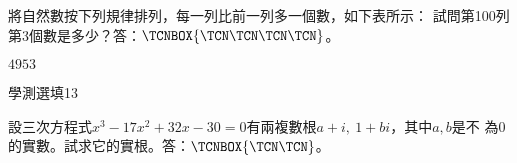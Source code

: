 \begin{QUESTIONS}
\begin{QUESTION}
\begin{QBODY}
			將自然數按下列規律排列，每一列比前一列多一個數，如下表所示：
			試問第100列第3個數是多少？答：$\TCNBOX{\TCN\TCN\TCN\TCN}$。
        \end{QBODY}
        \begin{QFROMS}
        \end{QFROMS}
        \begin{QTAGS}\end{QTAGS}
        \begin{QANS}
		$4953$
        \end{QANS}
        \begin{QSOLLIST}
        \end{QSOLLIST}
        \begin{QEMPTYSPACE}
        \end{QEMPTYSPACE}
    \end{QUESTION}
    \begin{QUESTION}
        \begin{ExamInfo}{89}{學測}{選填}{13}
        \end{ExamInfo}
        \begin{ExamAnsRateInfo}{}{}{}{}
        \end{ExamAnsRateInfo}
        \begin{QBODY}
		設三次方程式${{x}^{3}}-17{{x}^{2}}+32x-30=0$有兩複數根$a+i,\ 1+bi$，其中$a,b$是不
		為$0$的實數。試求它的實根。答：$\TCNBOX{\TCN\TCN}$。


\end{QBODY}
\end{QUESTION}
\end{QUESTIONS}
